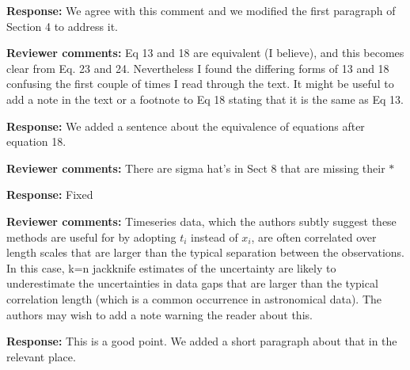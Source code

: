\documentclass{amsart}
\begin{document}
   \textbf{Response:} We agree with this comment and we modified the first paragraph of Section 4 to address it. 
   
  \bigskip
 \textbf{Reviewer comments: }
   Eq 13 and 18 are equivalent (I believe), and this becomes clear from Eq. 23 and 24. Nevertheless I found the differing forms of 13 and 18 confusing the first couple of times I read through the text. It might be useful to add a note in the text or a footnote to Eq 18 stating that it is the same as Eq 13.
 
 \textbf{Response:} We added a sentence about the equivalence of equations after equation 18. 
 
 \bigskip
  \textbf{Reviewer comments:} There are sigma hat's in Sect 8 that are missing their $*$
  
   \textbf{Response:} Fixed 
 
 \bigskip
 \textbf{Reviewer comments:}
  Timeseries data, which the authors subtly suggest these methods are useful for by adopting $t_i$ instead of $x_i$, are often correlated over length scales that are larger than the typical separation between the observations. In this case, k=n jackknife estimates of the uncertainty are likely to underestimate the uncertainties in data gaps that are larger than the typical correlation length (which is a common occurrence in astronomical data). The authors may wish to add a note warning the reader about this.

 \textbf{Response:}
 This is a good point. We added a short paragraph about that in the relevant place. 
\end{document}
